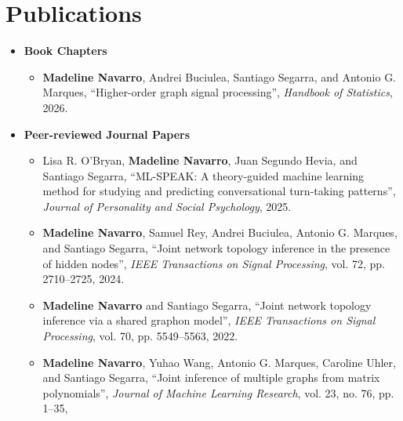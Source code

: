 \documentclass[letterpaper,10pt]{article}
\newcommand{\resumeItem}[1]{\item\small{#1}}
\newcommand{\resumeBullet}[1]{\item[\textbullet]\small{#1}}
\newcommand{\resumeCustomBullet}[2]{\item[#1]\small{#2}}
\newcommand{\resumeSubHeadingList}{\begin{itemize}[leftmargin=0.05in, label={}]}
\newcommand{\resumeSubHeadingListEnd}{\end{itemize}}
\begin{document}
\section{Publications}
\resumeSubHeadingList
  \resumeItem{\textbf{Book Chapters}}
      \begin{itemize}[leftmargin=0.25in, label={}]
          \resumeCustomBullet{{[B1]}}{
            \textbf{Madeline Navarro},
            Andrei Buciulea,
            Santiago Segarra,
            and
            Antonio G. Marques, 
            ``Higher-order graph signal processing'',
            \textit{Handbook of Statistics},
            2026.
          }
      \resumeSubHeadingListEnd
  \resumeItem{\textbf{Peer-reviewed Journal Papers}}
      \begin{itemize}[leftmargin=0.25in, label={}]
          \resumeCustomBullet{{[J1]}}{
            Lisa R. O'Bryan,
            \textbf{Madeline Navarro},
            Juan Segundo Hevia, 
            and
            Santiago Segarra,
            ``ML-SPEAK: A theory-guided machine learning method for studying and predicting conversational turn-taking patterns'',
            \textit{Journal of Personality and Social Psychology},
            2025.
          }
          \resumeCustomBullet{{[J2]}}{
            \textbf{Madeline Navarro},
            Samuel Rey,
            Andrei Buciulea,
            Antonio G. Marques, and
            Santiago Segarra,
            ``Joint network topology inference in the presence of hidden nodes'',
            \textit{IEEE Transactions on Signal Processing},
            vol. 72,
            pp. 2710--2725,
            2024.
          }
          \resumeCustomBullet{{[J3]}}{
            \textbf{Madeline Navarro} 
            and
            Santiago Segarra,
            ``Joint network topology inference via a shared graphon model'',
            \textit{IEEE Transactions on Signal Processing},
            vol. 70,
            pp. 5549--5563,
            2022.
          }
          \resumeCustomBullet{{[J4]}}{
            \textbf{Madeline Navarro},
            Yuhao Wang,
            Antonio G. Marques,
            Caroline Uhler, 
            and
            Santiago Segarra,
            ``Joint inference of multiple graphs from matrix polynomials'',
            \textit{Journal of Machine Learning Research},
            vol. 23,
            no. 76,
            pp. 1--35,
}
\end{itemize}
\end{itemize}
\end{document}
